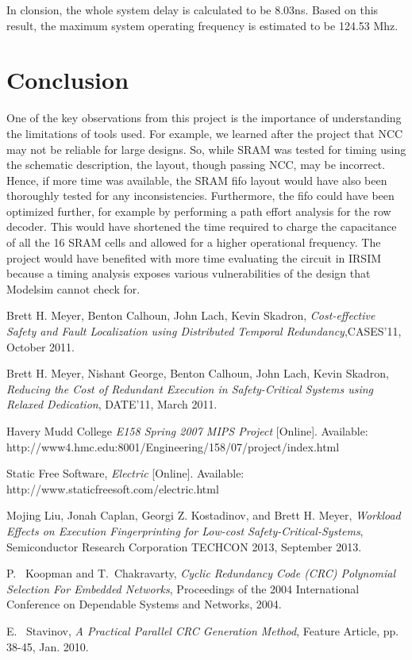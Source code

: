 \documentclass[10pt,journal,compsoc]{IEEEtran}
\begin{document}
    In clonsion, the whole system delay is calculated to be 8.03ns. Based on this result, the maximum system operating frequency is estimated to be 124.53 Mhz. 

\section{Conclusion}
One of the key observations from this project is the importance of understanding the limitations of tools used. For example, we learned after the project that NCC may not be reliable for large designs. So, while SRAM was tested for timing using the schematic description, the layout, though passing NCC, may be incorrect. Hence, if more time was available, the SRAM fifo layout would have also been thoroughly tested for any inconsistencies. Furthermore, the fifo could have been optimized further, for example by performing a path effort analysis for the row decoder. This would have shortened the time required to charge the capacitance of all the 16 SRAM cells and allowed for a higher operational frequency. 
The project would have benefited with more time evaluating the circuit in IRSIM because a timing analysis exposes various vulnerabilities of the design that Modelsim cannot check for. 





\begin{thebibliography}{1}


 Brett H. Meyer, Benton Calhoun, John Lach, Kevin Skadron, \emph{Cost-effective Safety and Fault Localization using Distributed Temporal Redundancy},CASES'11, October 2011.

Brett H. Meyer, Nishant George, Benton Calhoun, John Lach, Kevin Skadron, \emph{Reducing the Cost of Redundant Execution in Safety-Critical Systems using Relaxed Dedication}, DATE'11, March 2011.


Havery Mudd College \emph{E158 Spring 2007 MIPS Project} [Online]. Available: http://www4.hmc.edu:8001/Engineering/158/07/project/index.html

Static Free Software, \emph{Electric} [Online]. Available: http://www.staticfreesoft.com/electric.html

Mojing Liu, Jonah Caplan, Georgi Z. Kostadinov, and Brett H. Meyer, \emph{Workload Effects on Execution Fingerprinting for Low-cost Safety-Critical-Systems},  Semiconductor Research Corporation TECHCON 2013, September 2013.

P. ~Koopman and T.~Chakravarty, \emph{Cyclic Redundancy Code ({CRC}) Polynomial Selection For Embedded Networks}, Proceedings of the 2004 International Conference on Dependable Systems and Networks, 2004.

E. ~Stavinov, \emph{A Practical Parallel {CRC} Generation Method}, Feature Article, pp. 38-45, Jan. 2010. 

\end{thebibliography}









\end{document}
